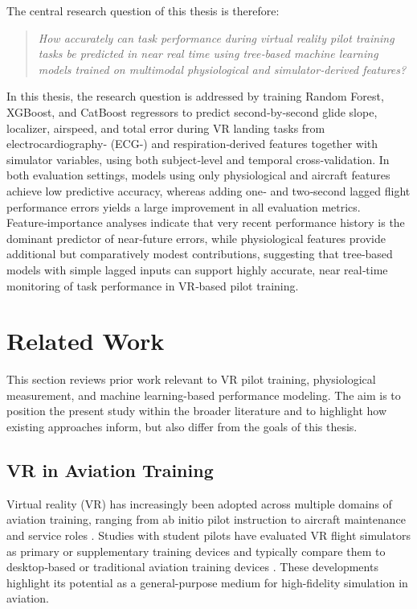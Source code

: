 \documentclass[11pt, a4paper]{article}
\begin{document}
The central research question of this thesis is therefore:

\begin{quote}
\emph{How accurately can task performance during virtual reality pilot training tasks be predicted in near real time using tree‑based machine learning models trained on multimodal physiological and simulator‑derived features?}
\end{quote}



In this thesis, the research question is addressed by training Random Forest, XGBoost, and CatBoost regressors to predict second‑by‑second glide slope, localizer, airspeed, and total error during VR landing tasks from electrocardiography‑ (ECG-) and respiration‑derived features together with simulator variables, using both subject‑level and temporal cross‑validation. In both evaluation settings, models using only physiological and aircraft features achieve low predictive accuracy, whereas adding one‑ and two‑second lagged flight performance errors yields a large improvement in all evaluation metrics. Feature‑importance analyses indicate that very recent performance history is the dominant predictor of near‑future errors, while physiological features provide additional but comparatively modest contributions, suggesting that tree‑based models with simple lagged inputs can support highly accurate, near real‑time monitoring of task performance in VR‑based pilot training.

\section{Related Work}
This section reviews prior work relevant to VR pilot training, physiological measurement, and machine learning-based performance modeling. The aim is to position the present study within the broader literature and to highlight how existing approaches inform, but also differ from the goals of this thesis.

\subsection{VR in Aviation Training}
Virtual reality (VR) has increasingly been adopted across multiple domains of aviation training, ranging from ab initio pilot instruction to aircraft maintenance and service roles \cite{fussell-2020,hight-2022,pena-2025}. Studies with student pilots have evaluated VR flight simulators as primary or supplementary training devices and typically compare them to desktop‑based or traditional aviation training devices \cite{hight-2022,guthridge-2023}. These developments highlight its potential as a general-purpose medium for high-fidelity simulation in aviation.
\end{document}

